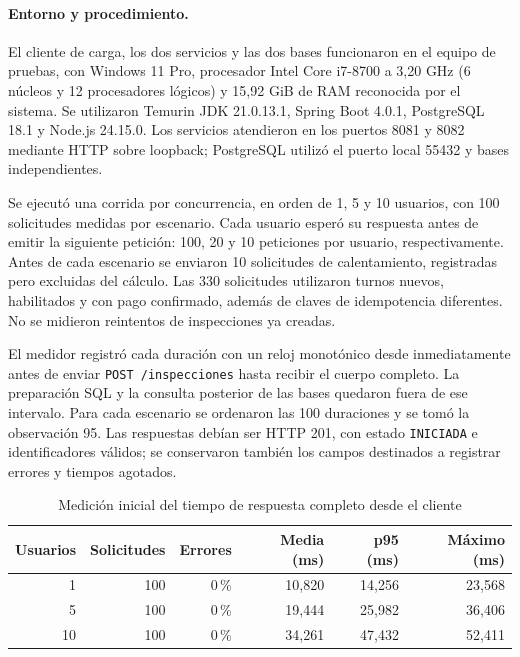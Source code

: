 \documentclass[11pt,a4paper]{article}
\begin{document}
	\paragraph{Entorno y procedimiento.}
	El cliente de carga, los dos servicios y las dos bases funcionaron en el equipo de pruebas, con Windows 11 Pro, procesador Intel Core i7-8700 a 3,20 GHz (6 núcleos y 12 procesadores lógicos) y 15,92 GiB de RAM reconocida por el sistema. Se utilizaron Temurin JDK 21.0.13.1, Spring Boot 4.0.1, PostgreSQL 18.1 y Node.js 24.15.0. Los servicios atendieron en los puertos 8081 y 8082 mediante HTTP sobre loopback; PostgreSQL utilizó el puerto local 55432 y bases independientes.
	
	Se ejecutó una corrida por concurrencia, en orden de 1, 5 y 10 usuarios, con 100 solicitudes medidas por escenario. Cada usuario esperó su respuesta antes de emitir la siguiente petición: 100, 20 y 10 peticiones por usuario, respectivamente. Antes de cada escenario se enviaron 10 solicitudes de calentamiento, registradas pero excluidas del cálculo. Las 330 solicitudes utilizaron turnos nuevos, habilitados y con pago confirmado, además de claves de idempotencia diferentes. No se midieron reintentos de inspecciones ya creadas.
	
	El medidor registró cada duración con un reloj monotónico desde inmediatamente antes de enviar \texttt{POST /inspecciones} hasta recibir el cuerpo completo. La preparación SQL y la consulta posterior de las bases quedaron fuera de ese intervalo. Para cada escenario se ordenaron las 100 duraciones y se tomó la observación 95. Las respuestas debían ser HTTP 201, con estado \texttt{INICIADA} e identificadores válidos; se conservaron también los campos destinados a registrar errores y tiempos agotados.
	
	\begin{table}[htbp]
		\centering
		\caption{Medición inicial del tiempo de respuesta completo desde el cliente}\label{tab:p95-nixon}
		\begin{tabular}{rrrrrr}
			\toprule
			\textbf{Usuarios} & \textbf{Solicitudes} & \textbf{Errores} & \textbf{Media (ms)} & \textbf{p95 (ms)} & \textbf{Máximo (ms)} \\
			\midrule
			1  & 100 & 0\,\% & 10,820 & 14,256 & 23,568 \\
			5  & 100 & 0\,\% & 19,444 & 25,982 & 36,406 \\
			10 & 100 & 0\,\% & 34,261 & 47,432 & 52,411 \\
			\bottomrule
		\end{tabular}
	\end{table}
	
\end{document}

